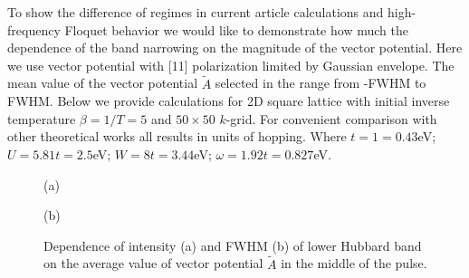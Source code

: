To show the difference of regimes in current article calculations and high-frequency Floquet behavior we would like to demonstrate how much the dependence of the band narrowing on the magnitude of the vector potential. Here we use vector potential with [11] polarization limited by Gaussian envelope.  The mean value of the vector potential $\tilde{A}$ selected in the range from -FWHM to FWHM. Below we provide calculations for 2D square lattice with initial inverse temperature $\beta=1/T=5$ and $50 \times 50$ $k$-grid. For convenient comparison with other theoretical works all results in units of hopping. Where $t=1=0.43$eV; $U=5.81t=2.5$eV; $W=8t=3.44$eV; $\omega=1.92t=0.827$eV. 
\begin{figure}[h!]
\begin{minipage}[h]{0.5\linewidth}
 (a) \\
\end{minipage}
\hfill
\begin{minipage}[h]{0.5\linewidth}
 (b) \\
\end{minipage}
\caption{Dependence of intensity (a) and FWHM (b) of lower Hubbard band on the average value of vector potential $\tilde{A}$ in the middle of the pulse.}
\label{Fig:LHB_I_W}
\end{figure}

